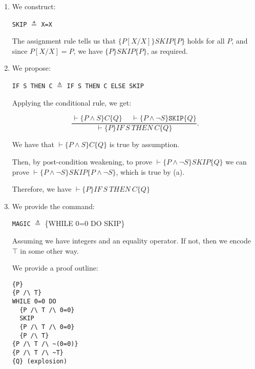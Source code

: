 


\begin{enumerate}[label=(\alph*)]

  \item
    We construct:

    \texttt{SKIP} $\triangleq$ \texttt{X=X}

    The assignment rule tells us that $\{P[X / X]\}SKIP\{P\}$ holds for all $P$, and since $P[X / X] = P$, we have $\{P\}SKIP\{P\}$, as required.

    \item
      We propose:

      \texttt{IF S THEN C} $\triangleq$ \texttt{IF S THEN C ELSE SKIP}

      Applying the conditional rule, we get:

      \[
        \frac{\vdash \{P\wedge S\}C\{Q\} \hspace{15pt} \vdash\{P \wedge \neg S\}\texttt{SKIP}\{Q\}}{\vdash \{P\}IF\ S\ THEN\ C\{Q\}}
      .\] 

      We have that $\vdash \{P \wedge S\}C\{Q\}$ is true by assumption.

      Then, by post-condition weakening, to prove $\vdash\{P \wedge \neg S\}SKIP\{Q\}$ we can prove $\vdash \{P\wedge \neg S\}SKIP\{P \wedge \neg S\}$, which is true by (a).

      Therefore, we have $\vdash \{P\}IF\ S\ THEN\ C\{Q\}$

      \item
        We provide the command:

        \texttt{MAGIC} $\triangleq$ \{WHILE 0=0 DO SKIP\}

        Assuming we have integers and an equality operator. If not, then we encode $\top$ in some other way.

        We provide a proof outline:
\begin{verbatim}
{P}
{P /\ T}
WHILE 0=0 DO
  {P /\ T /\ 0=0}
  SKIP
  {P /\ T /\ 0=0}
  {P /\ T}
{P /\ T /\ ~(0=0)}
{P /\ T /\ ~T}
{Q} (explosion)
\end{verbatim}









        
    \end{enumerate}

